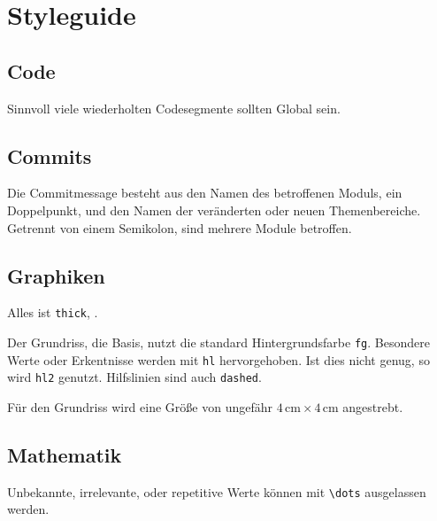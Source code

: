 \documentclass{article}
\begin{document}
\section{Styleguide}
\subsection{Code}
Sinnvoll viele wiederholten Codesegmente sollten Global sein.

\subsection{Commits}
Die Commitmessage besteht \idr aus den Namen des betroffenen Moduls, ein Doppelpunkt, und den Namen der veränderten oder neuen Themenbereiche. Getrennt von einem Semikolon, sind mehrere Module betroffen.

\subsection{Graphiken}
Alles ist \verb|thick|, \idr.

Der Grundriss, die Basis, nutzt die standard Hintergrundsfarbe \verb|fg|. Besondere Werte oder Erkentnisse werden mit \verb|hl| hervorgehoben. Ist dies nicht genug, so wird \verb|hl2| genutzt. Hilfslinien sind \idr auch \verb|dashed|.

Für den Grundriss wird eine Größe von ungefähr $4\,\text{cm} \times 4\,\text{cm}$ angestrebt.
\subsection{Mathematik}
Unbekannte, irrelevante, oder repetitive Werte können mit \verb|\dots| ausgelassen werden.
\end{document}
